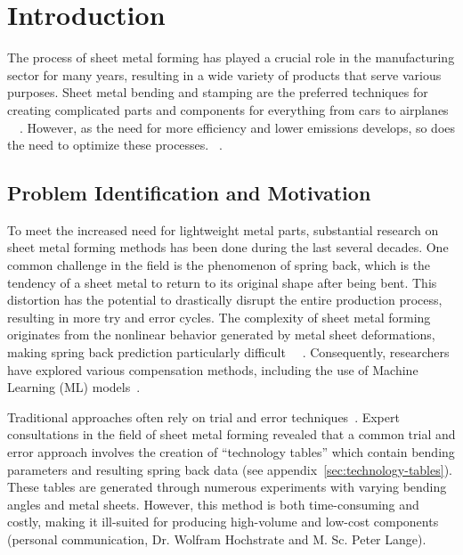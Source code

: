 \chapter{Introduction}\label{ch:introduction}

The process of sheet metal forming has played a crucial role in the manufacturing sector for many years, resulting in
a wide variety of products that serve various purposes.
Sheet metal bending and stamping are the preferred techniques for creating complicated parts and components for
everything from cars to airplanes
~\cite[p. 1]{cruz2021application}~\cite[p.1]{liu2021deep}.
However, as the need for more efficiency and lower emissions develops, so does the need to optimize these processes.
~\cite[p. 4]{zheng_reviewformingtechniques_2018}.


\section{Problem Identification and Motivation}\label{sec:problem-identification-and-motivation}
To meet the increased need for lightweight metal parts, substantial research on sheet metal forming methods has been
done during the last several decades.
One common challenge in the field is the phenomenon of spring back, which is the tendency of a sheet metal to return
to its original shape after being bent.
This distortion has the potential to drastically disrupt the entire production process, resulting in more try and
error cycles.
The complexity of sheet metal forming originates from the nonlinear behavior generated by metal sheet deformations,
making spring back prediction particularly difficult
~\cite[p. 1]{miranda_formingspringbackprediction_2018}~\cite[p. 1]{cruz2021application}.
Consequently, researchers have explored various compensation methods, including the use of Machine Learning (ML)
models~\cite[p.1]{liu2021deep}.

Traditional approaches often rely on trial and error techniques~\cite[p. 1]{dib2020single}.
Expert consultations in the field of sheet metal forming revealed that a common trial and error approach involves the
creation of ``technology tables'' which contain bending parameters and resulting spring back data
(see appendix~\ref{sec:technology-tables}).
These tables are generated through numerous experiments with varying bending angles and metal sheets.
However, this method is both time-consuming and costly, making it ill-suited for producing high-volume and low-cost
components (personal communication, Dr. Wolfram Hochstrate and M. Sc. Peter Lange).

